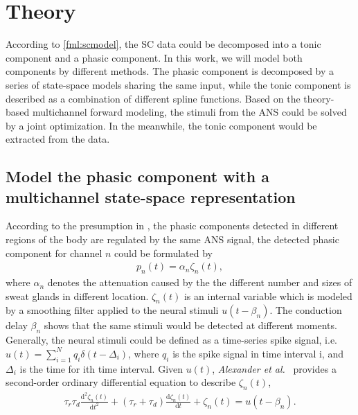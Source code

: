 \documentclass[10pt,conference]{ieeeconf}
\providecommand{\od}{\mathrm{d}}
\begin{document}
\section{Theory}

According to \eqref{fml:scmodel}, the SC data could be decomposed into a tonic component and a phasic component. In this work, we will model both components by different methods. The phasic component is decomposed by a series of state-space models sharing the same input, while the tonic component is described as a combination of different spline functions. Based on the theory-based multichannel forward modeling, the stimuli from the ANS could be solved by a joint optimization. In the meanwhile, the tonic component would be extracted from the data.

\subsection{Model the phasic component with a multichannel state-space representation}
According to the presumption in \cite{alexander2005separating,society2012publication,amin2019robust}, the phasic components detected in different regions of the body are regulated by the same ANS signal, the detected phasic component for channel $n$ could be formulated by
\begin{align}
p_n(t) = \alpha_n \zeta_n (t),
\end{align}
where $\alpha_n$ denotes the attenuation caused by the the different number and sizes of sweat glands in different location. $\zeta_n(t)$ is an internal variable which is modeled by a smoothing filter applied to the neural stimuli $u(t-\beta_n)$. The conduction delay $\beta_n$ shows that the same stimuli would be detected at different moments. Generally, the neural stimuli could be defined as a time-series spike signal, i.e. $u(t) = \sum_{i=1}^N q_i \delta(t - \Delta_i)$, where $q_i$ is the spike signal in time interval i, and $\Delta_i$ is the time for ith time interval. Given $u(t)$, \textit{Alexander et al.}~\cite{alexander2005separating} provides a second-order ordinary differential equation to describe $\zeta_n(t)$,
\begin{align} \label{fml:the:ode}
\tau_r \tau_d \frac{\od^2 \zeta_n(t)}{\od t^2} + (\tau_r + \tau_d) \frac{\od \zeta_n(t)}{\od t} + \zeta_n(t) = u(t - \beta_n).
\end{align}
\end{document}
